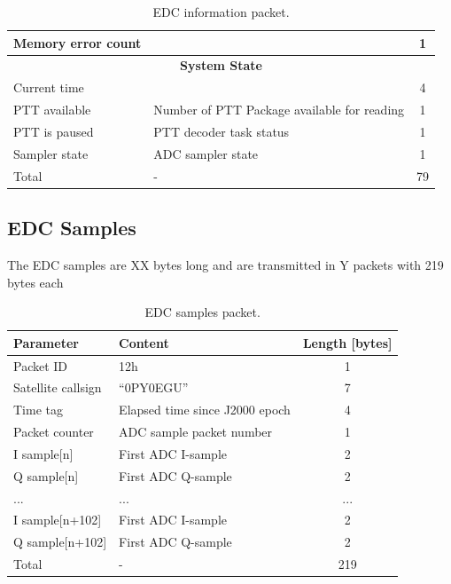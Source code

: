 \begin{table}[!h]
\begin{tabular}{llc}
        Memory error count &                                                  & 1 \\
        \midrule
        \multicolumn{3}{c}{\textbf{System State}} \\
        \midrule
        Current time       &                                                  & 4 \\
        PTT available      & Number of PTT Package available for reading      & 1 \\
        PTT is paused      & PTT decoder task status                          & 1 \\
        Sampler state      & ADC sampler state                                & 1 \\
        \midrule
        Total              & -                                                & 79 \\
        \bottomrule[1.5pt]
    \end{tabular}
    \caption{EDC information packet.}
    \label{tab:telemetry-edc}
\end{table}

\subsection{EDC Samples}

The EDC samples are XX bytes long and are transmitted in Y packets with 219 bytes each

\begin{table}[!h]
    \centering
    \begin{tabular}{llc}
        \toprule[1.5pt]
        \textbf{Parameter} & \textbf{Content}               & \textbf{Length [bytes]} \\
        \midrule
        Packet ID          & 12h                            & 1 \\
        Satellite callsign & ``0PY0EGU''                    & 7 \\
        Time tag           & Elapsed time since J2000 epoch & 4 \\
        Packet counter     & ADC sample packet number       & 1 \\
        I sample[n]        & First ADC I-sample             & 2 \\
        Q sample[n]        & First ADC Q-sample             & 2 \\
        ...                & ...                            & ... \\
        I sample[n+102]    & First ADC I-sample             & 2 \\
        Q sample[n+102]    & First ADC Q-sample             & 2 \\
        \midrule
        Total              & -                              & 219 \\
        \bottomrule[1.5pt]
    \end{tabular}
    \caption{EDC samples packet.}
    \label{tab:telemetry-edc-samples}
\end{table}

